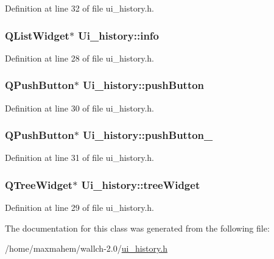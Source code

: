 Definition at line 32 of file ui\_\-history.h.

\hypertarget{classUi__history_ad735c929553117f86647de09fef4bc7c}{
\subsubsection[{info}]{\setlength{\rightskip}{0pt plus 5cm}QListWidget$\ast$ {\bf Ui\_\-history::info}}}
\label{classUi__history_ad735c929553117f86647de09fef4bc7c}


Definition at line 28 of file ui\_\-history.h.

\hypertarget{classUi__history_a7691a5d3d60ce064af93e73a3a784630}{
\subsubsection[{pushButton}]{\setlength{\rightskip}{0pt plus 5cm}QPushButton$\ast$ {\bf Ui\_\-history::pushButton}}}
\label{classUi__history_a7691a5d3d60ce064af93e73a3a784630}


Definition at line 30 of file ui\_\-history.h.

\hypertarget{classUi__history_a2d6dfc354da94241b8d00b1a15e2f6b9}{
\subsubsection[{pushButton\_\-2}]{\setlength{\rightskip}{0pt plus 5cm}QPushButton$\ast$ {\bf Ui\_\-history::pushButton\_}}}
\label{classUi__history_a2d6dfc354da94241b8d00b1a15e2f6b9}


Definition at line 31 of file ui\_\-history.h.

\hypertarget{classUi__history_a276cc06c05a31289ab6d85cbdf233f50}{
\subsubsection[{treeWidget}]{\setlength{\rightskip}{0pt plus 5cm}QTreeWidget$\ast$ {\bf Ui\_\-history::treeWidget}}}
\label{classUi__history_a276cc06c05a31289ab6d85cbdf233f50}


Definition at line 29 of file ui\_\-history.h.



The documentation for this class was generated from the following file:\begin{DoxyCompactItemize}
\item 
/home/maxmahem/wallch-\/2.0/\hyperlink{ui__history_8h}{ui\_\-history.h}\end{DoxyCompactItemize}
